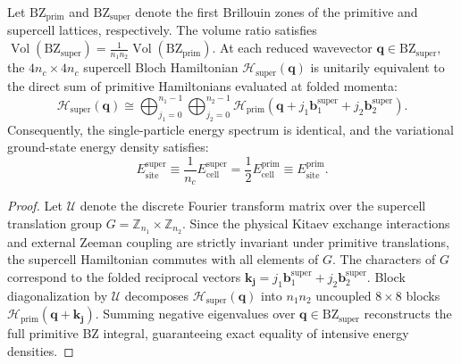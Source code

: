 \begin{theorem}
\label{thm:m1_7_bz_folding}
Let $\mathrm{BZ}_{\mathrm{prim}}$ and $\mathrm{BZ}_{\mathrm{super}}$ denote the first Brillouin zones of the primitive and supercell lattices, respectively. The volume ratio satisfies $\operatorname{Vol}(\mathrm{BZ}_{\mathrm{super}}) = \frac{1}{n_1 n_2} \operatorname{Vol}(\mathrm{BZ}_{\mathrm{prim}})$.
At each reduced wavevector $\mathbf{q} \in \mathrm{BZ}_{\mathrm{super}}$, the $4n_c \times 4n_c$ supercell Bloch Hamiltonian $\mathcal{H}_{\mathrm{super}}(\mathbf{q})$ is unitarily equivalent to the direct sum of primitive Hamiltonians evaluated at folded momenta:
\begin{equation}
\label{eq:m1_7_direct_sum_folding}
\mathcal{H}_{\mathrm{super}}(\mathbf{q}) \cong \bigoplus_{j_1=0}^{n_1-1} \bigoplus_{j_2=0}^{n_2-1} \mathcal{H}_{\mathrm{prim}}\left( \mathbf{q} + j_1 \mathbf{b}_1^{\mathrm{super}} + j_2 \mathbf{b}_2^{\mathrm{super}} \right).
\end{equation}
Consequently, the single-particle energy spectrum is identical, and the variational ground-state energy density satisfies:
\begin{equation}
\label{eq:m1_7_exact_energy_parity}
E_{\mathrm{site}}^{\mathrm{super}} \equiv \frac{1}{n_c} E_{\mathrm{cell}}^{\mathrm{super}} = \frac{1}{2} E_{\mathrm{cell}}^{\mathrm{prim}} \equiv E_{\mathrm{site}}^{\mathrm{prim}}.
\end{equation}
\end{theorem}
\begin{proof}
Let $\mathcal{U}$ denote the discrete Fourier transform matrix over the supercell translation group $G = \mathbb{Z}_{n_1} \times \mathbb{Z}_{n_2}$. Since the physical Kitaev exchange interactions and external Zeeman coupling are strictly invariant under primitive translations, the supercell Hamiltonian commutes with all elements of $G$. The characters of $G$ correspond to the folded reciprocal vectors $\mathbf{k}_{\mathbf{j}} = j_1 \mathbf{b}_1^{\mathrm{super}} + j_2 \mathbf{b}_2^{\mathrm{super}}$. Block diagonalization by $\mathcal{U}$ decomposes $\mathcal{H}_{\mathrm{super}}(\mathbf{q})$ into $n_1 n_2$ uncoupled $8 \times 8$ blocks $\mathcal{H}_{\mathrm{prim}}(\mathbf{q} + \mathbf{k}_{\mathbf{j}})$. Summing negative eigenvalues over $\mathbf{q} \in \mathrm{BZ}_{\mathrm{super}}$ reconstructs the full primitive BZ integral, guaranteeing exact equality of intensive energy densities.
\end{proof}

